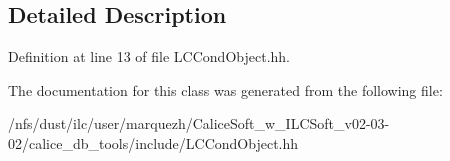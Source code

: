 \subsection{Detailed Description}


Definition at line 13 of file L\-C\-Cond\-Object.\-hh.



The documentation for this class was generated from the following file\-:\begin{DoxyCompactItemize}
\item 
/nfs/dust/ilc/user/marquezh/\-Calice\-Soft\-\_\-w\-\_\-\-I\-L\-C\-Soft\-\_\-v02-\/03-\/02/calice\-\_\-db\-\_\-tools/include/L\-C\-Cond\-Object.\-hh\end{DoxyCompactItemize}
